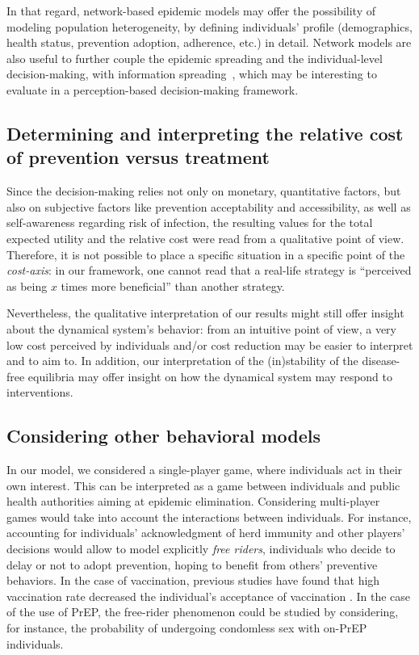 In that regard, network-based epidemic models may offer the possibility of modeling population heterogeneity, by defining individuals' profile (demographics, health status, prevention adoption, adherence, etc.) in detail. Network models are also useful to further couple the epidemic spreading and the individual-level decision-making, with information spreading~\cite[]{Chang2020}, which may be interesting to evaluate in a perception-based decision-making framework.


\subsection{Determining and interpreting the relative cost of prevention versus treatment}
Since the decision-making relies not only on monetary, quantitative factors, but also on subjective factors like prevention acceptability and accessibility, as well as self-awareness regarding risk of infection, the resulting values for the total expected utility and the relative cost were read from a qualitative point of view. 
%
Therefore, it is not possible to place a specific situation in a specific point of the {\it cost-axis}: in our framework, one cannot read that a real-life strategy is ``perceived as being $x$ times more beneficial'' than another strategy. 

Nevertheless, the qualitative interpretation of our results might still offer insight about the dynamical system's behavior: from an intuitive point of view, a very low cost perceived by individuals and/or cost reduction may be easier to interpret and to aim to. In addition, our interpretation of the (in)stability of the disease-free equilibria may offer insight on how the dynamical system may respond to interventions. 


\subsection{Considering other behavioral models}
In our model, we considered a single-player game, where individuals act in their own interest. This can be interpreted as a game between individuals and public health authorities aiming at epidemic elimination. Considering multi-player games would take into account the interactions between individuals. For instance, accounting for individuals' acknowledgment of herd immunity and other players' decisions would allow to model explicitly \textit{free riders}, individuals who decide to delay or not to adopt prevention, hoping to benefit from others' preventive behaviors. In the case of vaccination, previous studies have found that high vaccination rate decreased the individual's acceptance of vaccination \cite[]{Ibuka2014}. In the case of the use of PrEP, the free-rider phenomenon could be studied by considering, for instance, the probability of undergoing condomless sex with on-PrEP individuals. 

